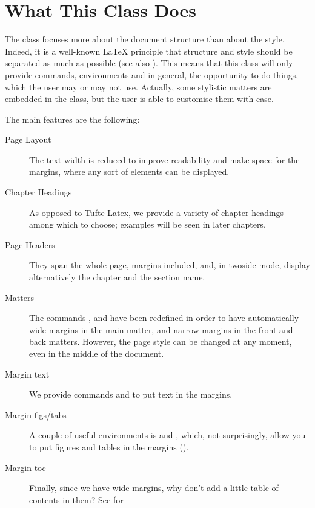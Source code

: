 \section{What This Class Does}

The  class focuses more about the document structure than
about the style. Indeed, it is a well-known \LaTeX\xspace principle that
structure and style should be separated as much as possible (see also
). This means that this class will only provide
commands, environments and in general, the opportunity to do things,
which the user may or may not use. Actually, some stylistic matters are
embedded in the class, but the user is able to customise them with ease.

The main features are the following:

\begin{description}
	\item[Page Layout] The text width is reduced to improve readability
	and make space for the margins, where any sort of elements can be
	displayed.
	\item[Chapter Headings] As opposed to Tufte-Latex, we provide a
	variety of chapter headings among which to choose; examples will be
	seen in later chapters.
	\item[Page Headers] They span the whole page, margins included, and,
	in twoside mode, display alternatively the chapter and the section
	name.
	\item[Matters] The commands ,
	 and  have been redefined in
	order to have automatically wide margins in the main matter, and
	narrow margins in the front and back matters. However, the page
	style can be changed at any moment, even in the middle of the
	document.
	\item[Margin text] We provide commands  and
	 to put text in the
	margins.
	\item[Margin figs/tabs] A couple of useful environments is
	 and , which, not
	surprisingly, allow you to put figures and tables in the margins
	(\cfr {}).
	\item[Margin toc] Finally, since we have wide margins, why don't add
	a little table of contents in them? See  for

\end{description}
